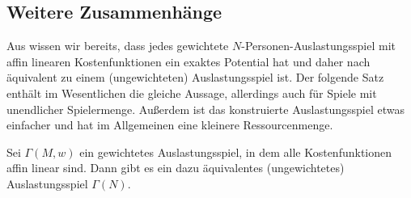 \subsection{Weitere Zusammenhänge}


Aus  wissen wir bereits, dass jedes gewichtete $N$-Personen-Auslastungsspiel mit affin linearen Kostenfunktionen ein exaktes Potential hat und daher nach  äquivalent zu einem (ungewichteten) Auslastungsspiel ist. Der folgende Satz enthält im Wesentlichen die gleiche Aussage, allerdings auch für Spiele mit unendlicher Spielermenge. Außerdem ist das konstruierte Auslastungsspiel etwas einfacher und hat im Allgemeinen eine kleinere Ressourcenmenge.

\begin{satz}\label{satz:GewAuslZuUngewAusl}
	Sei $\Gamma(M,w)$ ein gewichtetes Auslastungsspiel, in dem alle Kostenfunktionen affin linear sind. Dann gibt es ein dazu äquivalentes (ungewichtetes) Auslastungsspiel $\Gamma(N)$. 
\end{satz}

